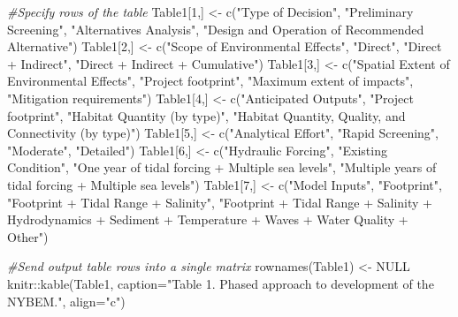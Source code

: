 \documentclass[
]{book}
\newenvironment{Shaded}{\begin{snugshade}}{\end{snugshade}}
\newcommand{\AttributeTok}[1]{\textcolor[rgb]{0.77,0.63,0.00}{#1}}
\newcommand{\CommentTok}[1]{\textcolor[rgb]{0.56,0.35,0.01}{\textit{#1}}}
\newcommand{\ConstantTok}[1]{\textcolor[rgb]{0.00,0.00,0.00}{#1}}
\newcommand{\DecValTok}[1]{\textcolor[rgb]{0.00,0.00,0.81}{#1}}
\newcommand{\FunctionTok}[1]{\textcolor[rgb]{0.00,0.00,0.00}{#1}}
\newcommand{\NormalTok}[1]{#1}
\newcommand{\OtherTok}[1]{\textcolor[rgb]{0.56,0.35,0.01}{#1}}
\newcommand{\SpecialCharTok}[1]{\textcolor[rgb]{0.00,0.00,0.00}{#1}}
\newcommand{\StringTok}[1]{\textcolor[rgb]{0.31,0.60,0.02}{#1}}
\begin{document}
\begin{Shaded}
\begin{Highlighting}[]
\CommentTok{\#Specify rows of the table}
\NormalTok{Table1[}\DecValTok{1}\NormalTok{,] }\OtherTok{\textless{}{-}} \FunctionTok{c}\NormalTok{(}\StringTok{"Type of Decision"}\NormalTok{, }\StringTok{"Preliminary Screening"}\NormalTok{, }\StringTok{"Alternatives Analysis"}\NormalTok{, }\StringTok{"Design and Operation of Recommended Alternative"}\NormalTok{)}
\NormalTok{Table1[}\DecValTok{2}\NormalTok{,] }\OtherTok{\textless{}{-}} \FunctionTok{c}\NormalTok{(}\StringTok{"Scope of Environmental Effects"}\NormalTok{, }\StringTok{"Direct"}\NormalTok{, }\StringTok{"Direct + Indirect"}\NormalTok{, }\StringTok{"Direct + Indirect + Cumulative"}\NormalTok{)}
\NormalTok{Table1[}\DecValTok{3}\NormalTok{,] }\OtherTok{\textless{}{-}} \FunctionTok{c}\NormalTok{(}\StringTok{"Spatial Extent of Environmental Effects"}\NormalTok{, }\StringTok{"Project footprint"}\NormalTok{, }\StringTok{"Maximum extent of impacts"}\NormalTok{, }\StringTok{"Mitigation requirements"}\NormalTok{)}
\NormalTok{Table1[}\DecValTok{4}\NormalTok{,] }\OtherTok{\textless{}{-}} \FunctionTok{c}\NormalTok{(}\StringTok{"Anticipated Outputs"}\NormalTok{, }\StringTok{"Project footprint"}\NormalTok{, }\StringTok{"Habitat Quantity (by type)"}\NormalTok{, }\StringTok{"Habitat Quantity, Quality, and Connectivity (by type)"}\NormalTok{)}
\NormalTok{Table1[}\DecValTok{5}\NormalTok{,] }\OtherTok{\textless{}{-}} \FunctionTok{c}\NormalTok{(}\StringTok{"Analytical Effort"}\NormalTok{, }\StringTok{"Rapid Screening"}\NormalTok{, }\StringTok{"Moderate"}\NormalTok{, }\StringTok{"Detailed"}\NormalTok{)}
\NormalTok{Table1[}\DecValTok{6}\NormalTok{,] }\OtherTok{\textless{}{-}} \FunctionTok{c}\NormalTok{(}\StringTok{"Hydraulic Forcing"}\NormalTok{, }\StringTok{"Existing Condition"}\NormalTok{, }\StringTok{"One year of tidal forcing + Multiple sea levels"}\NormalTok{, }\StringTok{"Multiple years of tidal forcing + Multiple sea levels"}\NormalTok{)}
\NormalTok{Table1[}\DecValTok{7}\NormalTok{,] }\OtherTok{\textless{}{-}} \FunctionTok{c}\NormalTok{(}\StringTok{"Model Inputs"}\NormalTok{, }\StringTok{"Footprint"}\NormalTok{, }\StringTok{"Footprint + Tidal Range + Salinity"}\NormalTok{, }\StringTok{"Footprint + Tidal Range + Salinity + Hydrodynamics + Sediment + Temperature + Waves + Water Quality + Other"}\NormalTok{)}

\CommentTok{\#Send output table rows into a single matrix}
\FunctionTok{rownames}\NormalTok{(Table1) }\OtherTok{\textless{}{-}} \ConstantTok{NULL}
\NormalTok{knitr}\SpecialCharTok{::}\FunctionTok{kable}\NormalTok{(Table1, }\AttributeTok{caption=}\StringTok{"Table 1. Phased approach to development of the NYBEM."}\NormalTok{, }\AttributeTok{align=}\StringTok{"c"}\NormalTok{) }
\end{Highlighting}
\end{Shaded}
\end{document}
